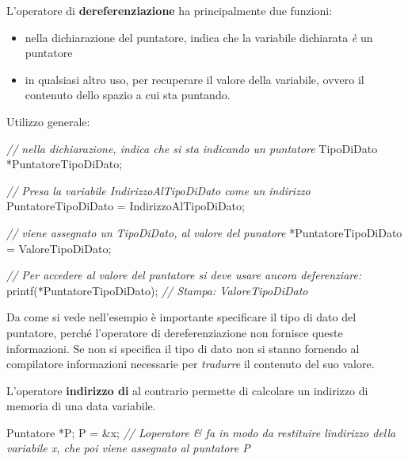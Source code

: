 \documentclass[
]{article}
\newenvironment{Shaded}{}{}
\newcommand{\CommentTok}[1]{\textcolor[rgb]{0.38,0.63,0.69}{\textit{#1}}}
\newcommand{\NormalTok}[1]{#1}
\begin{document}
L'operatore di \textbf{dereferenziazione} ha principalmente due
funzioni:

\begin{itemize}
\item
  nella dichiarazione del puntatore, indica che la variabile dichiarata
  \emph{è} un puntatore
\item
  in qualsiasi altro uso, per recuperare il valore della variabile,
  ovvero il contenuto dello spazio a cui sta puntando.
\end{itemize}

Utilizzo generale:

\begin{Shaded}
\begin{Highlighting}[]
\CommentTok{// nella dichiarazione, indica che si sta indicando un puntatore}
\NormalTok{TipoDiDato *PuntatoreTipoDiDato;}

\CommentTok{// Presa la variabile \textquotesingle{}IndirizzoAlTipoDiDato\textquotesingle{} come un indirizzo}
\NormalTok{PuntatoreTipoDiDato = IndirizzoAlTipoDiDato; }

\CommentTok{// viene assegnato un TipoDiDato, al valore del punatore}
\NormalTok{*PuntatoreTipoDiDato = ValoreTipoDiDato; }

\CommentTok{// Per accedere al valore del puntatore si deve usare ancora deferenziare:}
\NormalTok{printf(*PuntatoreTipoDiDato); }\CommentTok{// Stampa: ValoreTipoDiDato}
\end{Highlighting}
\end{Shaded}

Da come si vede nell'esempio è importante specificare il tipo di dato
del puntatore, perché l'operatore di dereferenziazione non fornisce
queste informazioni. Se non si specifica il tipo di dato non si stanno
fornendo al compilatore informazioni necessarie per \emph{tradurre} il
contenuto del suo valore.

L'operatore \textbf{indirizzo di} al contrario permette di calcolare un
indirizzo di memoria di una data variabile.

\begin{Shaded}
\begin{Highlighting}[]
\NormalTok{Puntatore *P;}
\NormalTok{P = \&x;}
\CommentTok{// L\textquotesingle{}operatore \textquotesingle{}\&\textquotesingle{} fa in modo da restituire l\textquotesingle{}indirizzo della variabile x, che poi viene assegnato al puntatore P}
\end{Highlighting}
\end{Shaded}
\end{document}
